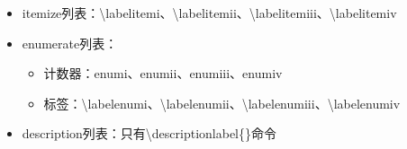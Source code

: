 ﻿\documentclass{article}
\begin{document}
    \begin{itemize}
        \item itemize列表：\textbackslash{}labelitemi、\textbackslash{}labelitemii、\textbackslash{}labelitemiii、\textbackslash{}labelitemiv
        \item enumerate列表：
        \begin{itemize}
            \item 计数器：enumi、enumii、enumiii、enumiv
            \item 标签：\textbackslash{}labelenumi、\textbackslash{}labelenumii、\textbackslash{}labelenumiii、\textbackslash{}labelenumiv
        \end{itemize}
        \item description列表：只有\textbackslash{}descriptionlabel\{\}命令
    \end{itemize}

\dotfill
\end{document}
